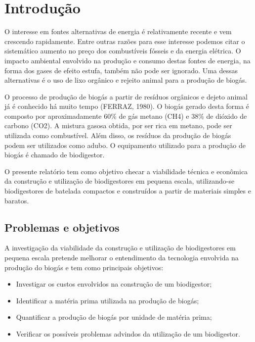 \chapter{Introdução}

O interesse em fontes alternativas de energia é relativamente recente e vem crescendo rapidamente. Entre outras razões para esse interesse podemos citar o sistemático aumento no preço dos combustíveis fósseis e da energia elétrica. O impacto ambiental envolvido na produção e consumo destas fontes de energia, na forma dos gases de efeito estufa, também não pode ser ignorado. Uma dessas alternativas é o uso de lixo orgânico e rejeito animal para a produção de biogás.

O processo de produção de biogás a partir de resíduos orgânicos e dejeto animal já é conhecido há muito tempo (FERRAZ, 1980). O biogás gerado desta forma é composto por aproximadamente 60\% de gás metano (CH4) e 38\% de dióxido de carbono (CO2). A mistura gasosa obtida, por ser rica em metano, pode ser utilizada como combustível. Além disso, os resíduos da produção de biogás podem ser utilizados como adubo. O equipamento utilizado para a produção de biogás é chamado de biodigestor.

O presente relatório tem como objetivo checar a viabilidade técnica e econômica da construção e utilização de biodigestores em pequena escala, utilizando-se biodigestores de batelada compactos e construídos a partir de materiais simples e baratos. 

\section{Problemas e objetivos}

A investigação da viabilidade da construção e utilização de biodigestores em pequena escala pretende melhorar o entendimento da tecnologia envolvida na produção do biogás e tem como principais objetivos:

\begin{itemize}
\item Investigar os custos envolvidos na construção de um biodigestor;
\item Identificar a matéria prima utilizada na produção de biogás;
\item Quantificar a produção de biogás por unidade de matéria prima;
\item Verificar os possíveis problemas advindos da utilização de um biodigestor.
\end{itemize}

